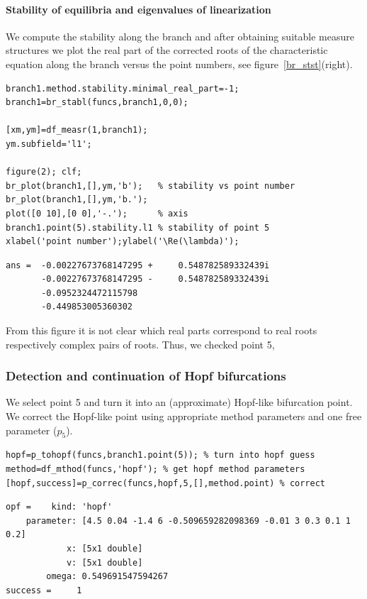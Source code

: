 \documentclass[10pt]{scrartcl}
\renewcommand{\Re}{\operatorname{Re}}
\begin{document}
\paragraph{Stability of equilibria and eigenvalues of linearization}
We compute the stability along the branch and after obtaining suitable
measure structures we plot the real part of the corrected roots of the
characteristic equation along the branch versus the point numbers, see
figure~\ref{br_stst}(right).
\begin{lstlisting}
branch1.method.stability.minimal_real_part=-1;
branch1=br_stabl(funcs,branch1,0,0);

[xm,ym]=df_measr(1,branch1);
ym.subfield='l1';

figure(2); clf;
br_plot(branch1,[],ym,'b');   % stability vs point number
br_plot(branch1,[],ym,'b.');
plot([0 10],[0 0],'-.');      % axis
branch1.point(5).stability.l1 % stability of point 5
xlabel('point number');ylabel('\Re(\lambda)');  
\end{lstlisting}
{\small
\begin{verbatim}
ans =  -0.00227673768147295 +     0.548782589332439i
       -0.00227673768147295 -     0.548782589332439i
       -0.0952324472115798                         
       -0.449853005360302              
\end{verbatim}
}
From this figure it is not clear which real parts correspond 
to real roots respectively complex pairs of roots. Thus, we checked point 5,

\subsubsection{Detection and continuation of Hopf bifurcations}
\label{sec:sd:hopf}
We select point 5 and turn it into an (approximate) Hopf-like 
bifurcation point. We correct the Hopf-like point using appropriate method parameters
and one free parameter ($p_5$). 
\begin{lstlisting}
hopf=p_tohopf(funcs,branch1.point(5)); % turn into hopf guess
method=df_mthod(funcs,'hopf'); % get hopf method parameters
[hopf,success]=p_correc(funcs,hopf,5,[],method.point) % correct
\end{lstlisting}
{\small
\begin{verbatim}
opf =    kind: 'hopf'
    parameter: [4.5 0.04 -1.4 6 -0.509659282098369 -0.01 3 0.3 0.1 1 0.2]
            x: [5x1 double]
            v: [5x1 double]
        omega: 0.549691547594267
success =     1
\end{verbatim}}
\end{document}
